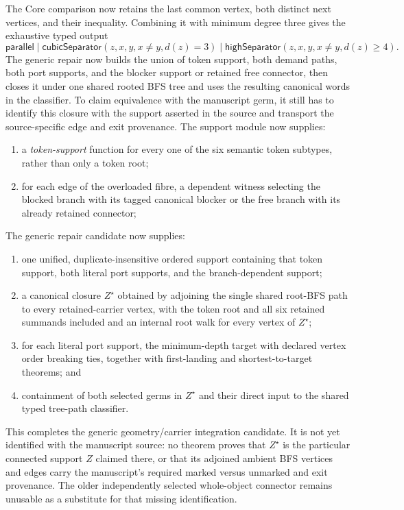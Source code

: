 \documentclass[11pt]{article}
\begin{document}
The Core comparison now retains the last common vertex, both distinct next
vertices, and their inequality.  Combining it with minimum degree three gives
the exhaustive typed output
\[
 \mathsf{parallel}\mid
 \mathsf{cubicSeparator}(z,x,y,x\ne y,d(z)=3)\mid
 \mathsf{highSeparator}(z,x,y,x\ne y,d(z)\ge4).
\]
The generic repair now builds the union of token support, both demand paths,
both port supports, and the blocker support or retained free connector, then
closes it under one shared rooted BFS tree and uses the resulting canonical
words in the classifier.  To claim equivalence with the manuscript germ, it
still has to identify this closure with the support asserted in the source and
transport the source-specific edge and exit provenance.
The support module now supplies:
\begin{enumerate}
\item a \emph{token-support} function for every one of the six semantic token
subtypes, rather than only a token root;
\item for each edge of the overloaded fibre, a dependent witness selecting
the blocked branch with its tagged canonical blocker or the free branch with
its already retained connector;
\end{enumerate}
The generic repair candidate now supplies:
\begin{enumerate}
\item one unified, duplicate-insensitive ordered support containing that token
support, both literal port supports, and the branch-dependent support;
\item a canonical closure $Z^\star$ obtained by adjoining the single shared
root-BFS path to every retained-carrier vertex, with the token root and all six
retained summands included and an internal root walk for every vertex of
$Z^\star$;
\item for each literal port support, the minimum-depth target with declared
vertex order breaking ties, together with first-landing and shortest-to-target
theorems; and
\item containment of both selected germs in $Z^\star$ and their direct input
to the shared typed tree-path classifier.
\end{enumerate}
This completes the generic geometry/carrier integration candidate.  It is not
yet identified with the manuscript source: no theorem proves that $Z^\star$
is the particular connected support $Z$ claimed there, or that its adjoined
ambient BFS vertices and edges carry the manuscript's required marked versus
unmarked and exit provenance.  The older independently selected whole-object
connector remains unusable as a substitute for that missing identification.
\end{document}
